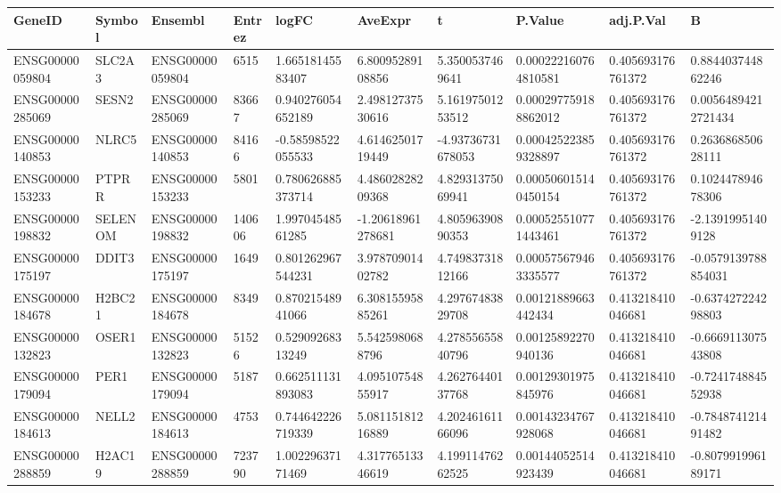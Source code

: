 \begingroup
\tiny
\setlength{\tabcolsep}{2pt}
\renewcommand{\arraystretch}{1.18}
\begin{tabular}{@{}llllllllll@{}}
\toprule
GeneID & Symbol & Ensembl & Entrez & logFC & AveExpr & t & P.Value & adj.P.Val & B \\
\midrule
ENSG00000059804 & SLC2A3 & ENSG00000059804 & 6515 & 1.66518145583407 & 6.80095289108856 & 5.3500537469641 & 0.000222160764810581 & 0.405693176761372 & 0.884403744862246 \\
ENSG00000285069 & SESN2 & ENSG00000285069 & 83667 & 0.940276054652189 & 2.49812737530616 & 5.16197501253512 & 0.000297759188862012 & 0.405693176761372 & 0.00564894212721434 \\
ENSG00000140853 & NLRC5 & ENSG00000140853 & 84166 & -0.58598522055533 & 4.61462501719449 & -4.93736731678053 & 0.000425223859328897 & 0.405693176761372 & 0.263686850628111 \\
ENSG00000153233 & PTPRR & ENSG00000153233 & 5801 & 0.780626885373714 & 4.48602828209368 & 4.82931375069941 & 0.000506015140450154 & 0.405693176761372 & 0.102447894678306 \\
ENSG00000198832 & SELENOM & ENSG00000198832 & 140606 & 1.99704548561285 & -1.20618961278681 & 4.80596390890353 & 0.000525510771443461 & 0.405693176761372 & -2.13919951409128 \\
ENSG00000175197 & DDIT3 & ENSG00000175197 & 1649 & 0.801262967544231 & 3.97870901402782 & 4.74983731812166 & 0.000575679463335577 & 0.405693176761372 & -0.0579139788854031 \\
ENSG00000184678 & H2BC21 & ENSG00000184678 & 8349 & 0.87021548941066 & 6.30815595885261 & 4.29767483829708 & 0.00121889663442434 & 0.413218410046681 & -0.637427224298803 \\
ENSG00000132823 & OSER1 & ENSG00000132823 & 51526 & 0.52909268313249 & 5.5425980688796 & 4.27855655840796 & 0.00125892270940136 & 0.413218410046681 & -0.666911307543808 \\
ENSG00000179094 & PER1 & ENSG00000179094 & 5187 & 0.662511131893083 & 4.09510754855917 & 4.26276440137768 & 0.00129301975845976 & 0.413218410046681 & -0.724174884552938 \\
ENSG00000184613 & NELL2 & ENSG00000184613 & 4753 & 0.744642226719339 & 5.08115181216889 & 4.20246161166096 & 0.00143234767928068 & 0.413218410046681 & -0.784874121491482 \\
ENSG00000288859 & H2AC19 & ENSG00000288859 & 723790 & 1.00229637171469 & 4.31776513346619 & 4.19911476262525 & 0.00144052514923439 & 0.413218410046681 & -0.807991996189171 \\

\end{tabular}
